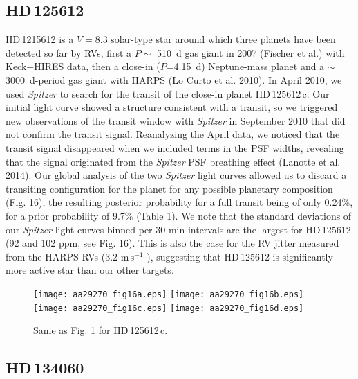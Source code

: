 \documentclass[traditabstract]{aa}
\newcommand{\ms}{\mbox{m\,s$^{-1}$} }
\begin{document}
\subsection{HD\,125612}
HD\,1215612 is a $V=8.3$ solar-type star around which three planets have been detected so far by RVs, first a $P \sim$ 510~d gas giant  in 2007 (Fischer et al.) with Keck+HIRES data, then  a close-in ($P$=4.15~d) Neptune-mass planet and a $\sim$3000~d-period gas giant with HARPS (Lo Curto et al. 2010). In April 2010, we used {\it Spitzer} to search for the transit of the close-in planet HD\,125612\,c. Our initial light curve showed a structure consistent with a transit, so we triggered new observations of the transit window with {\it Spitzer} in September 2010 that did not confirm the transit signal. Reanalyzing the April data, we noticed that the transit signal disappeared  when we included terms in the PSF widths, revealing that the signal originated from the {\it Spitzer} PSF breathing effect (Lanotte et al. 2014). Our global analysis of the two {\it Spitzer} light curves allowed us to discard a transiting configuration for the planet for any possible planetary composition (Fig. 16), the resulting posterior probability for a full transit being of only 0.24\%, for a prior probability of 9.7\% (Table 1). 
We note that the standard deviations of our {\it Spitzer} light curves binned per 30 min intervals are the largest for HD\,125612 (92 and 102 ppm, see Fig. 16). This is also the case for the RV  jitter measured from the HARPS RVs (3.2 \ms), suggesting that HD\,125612 is significantly more active star than our other targets. 

\begin{figure}
\label{fig:18}
\centering                     
\texttt{[image: aa29270\_fig16a.eps]}
\texttt{[image: aa29270\_fig16b.eps]}
\texttt{[image: aa29270\_fig16c.eps]}
\texttt{[image: aa29270\_fig16d.eps]}
\caption{Same as Fig. 1 for HD\,125612\,c.}
\end{figure} 

\subsection{HD\,134060}
\end{document}
